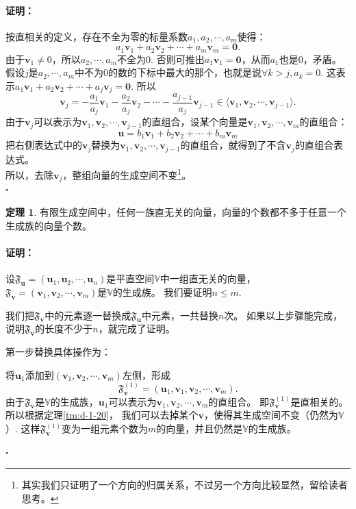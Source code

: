 \documentclass[12pt,UTF8]{ctexbook}
\theoremstyle{definition}
\newtheorem{tm}{定理}[section]
\theoremstyle{plain}
\renewenvironment{proof}{\paragraph{\textbf{证明：}}}{\hfill$\square$}
\begin{document}
\begin{appendix}
\begin{proof}
    按直相关的定义，存在不全为零的标量系数$a_1, a_2, \cdots, a_m$使得：
    $$ a_1\mathbf{v}_1+a_2\mathbf{v}_2+\cdots+a_m\mathbf{v}_m = \mathbf{0}. $$
    由于$\mathbf{v}_1 \neq 0$，所以$a_2, \cdots, a_m$不全为0. 否则可推出$a_1\mathbf{v}_1 = \mathbf{0}$，从而$a_1$也是0，矛盾。\\
    假设$j$是$a_2, \cdots, a_m$中不为0的数的下标中最大的那个，也就是说$\forall k > j, a_k = 0$. 这表示$ a_1\mathbf{v}_1+a_2\mathbf{v}_2+\cdots+a_j\mathbf{v}_j = \mathbf{0}. $
    所以
    $$ \mathbf{v}_j = -\frac{a_1}{a_j}\mathbf{v}_1-\frac{a_2}{a_j}\mathbf{v}_2-\cdots-\frac{a_{j-1}}{a_j}\mathbf{v}_{j-1} \in \langle \mathbf{v}_1, \mathbf{v}_2 , \cdots , \mathbf{v}_{j-1}\rangle. $$
    由于$ \mathbf{v}_j$可以表示为$\mathbf{v}_1, \mathbf{v}_2 , \cdots , \mathbf{v}_{j-1}$的直组合，设某个向量是$\mathbf{v}_1, \mathbf{v}_2 , \cdots , \mathbf{v}_m$的直组合：
    $$ \mathbf{u} = b_1\mathbf{v}_1+b_2\mathbf{v}_2+\cdots+b_m\mathbf{v}_m$$
    把右侧表达式中的$\mathbf{v}_j$替换为$\mathbf{v}_1, \mathbf{v}_2 , \cdots , \mathbf{v}_{j-1}$的直组合，就得到了不含$\mathbf{v}_j$的直组合表达式。\\
    所以，去除$\mathbf{v}_j$，整组向量的生成空间不变\footnote{其实我们只证明了一个方向的归属关系，不过另一个方向比较显然，留给读者思考。}。\\
\end{proof}

\begin{tm}\label{tm:d-1-30}
    有限生成空间中，任何一族直无关的向量，向量的个数都不多于任意一个生成族的向量个数。
\end{tm}

\begin{proof}
    
    设$\mathfrak{F}_{\mathbf{u}} = (\mathbf{u}_1, \mathbf{u}_2, \cdots , \mathbf{u}_n )$是平直空间$\mathbb{V}$中一组直无关的向量，
    $\mathfrak{F}_{\mathbf{v}} = (\mathbf{v}_1, \mathbf{v}_2, \cdots , \mathbf{v}_m )$是$\mathbb{V}$的生成族。
    我们要证明$n \leq m$. 

    我们把$\mathfrak{F}_{\mathbf{v}}$中的元素逐一替换成$\mathfrak{F}_{\mathbf{u}}$中元素，一共替换$n$次。
    如果以上步骤能完成，说明$\mathfrak{F}_{\mathbf{v}}$的长度不少于$n$，就完成了证明。

    第一步替换具体操作为：

    将$\mathbf{u}_1$添加到$(\mathbf{v}_1, \mathbf{v}_2, \cdots , \mathbf{v}_m )$左侧，形成
    $$\mathfrak{F}_{\mathbf{v}}^{(1)} = (\mathbf{u}_1, \mathbf{v}_1, \mathbf{v}_2, \cdots , \mathbf{v}_m ).$$
    由于$\mathfrak{F}_{\mathbf{v}}$是$\mathbb{V}$的生成族，$\mathbf{u}_1$可以表示为$\mathbf{v}_1, \mathbf{v}_2, \cdots , \mathbf{v}_m$的直组合。
    即$\mathfrak{F}_{\mathbf{v}}^{(1)}$是直相关的。所以根据定理\ref{tm:d-1-20}，
    我们可以去掉某个$\mathbf{v}$，使得其生成空间不变（仍然为$\mathbb{V}$）.
    这样$\mathfrak{F}_{\mathbf{v}}^{(1)}$变为一组元素个数为$m$的向量，并且仍然是$\mathbb{V}$的生成族。
    

\end{proof}
\end{appendix}
\end{document}
